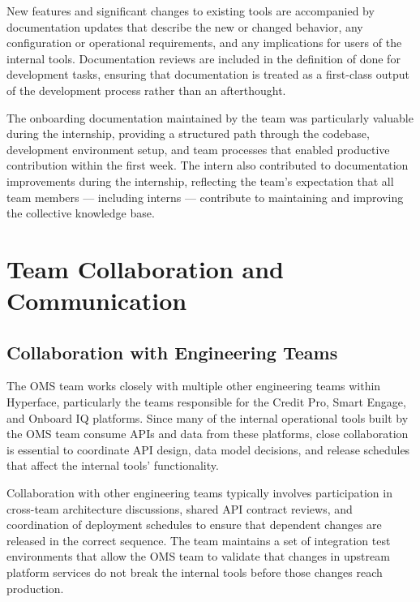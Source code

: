 New features and significant changes to existing tools are accompanied by documentation updates that describe the new or changed behavior, any configuration or operational requirements, and any implications for users of the internal tools. Documentation reviews are included in the definition of done for development tasks, ensuring that documentation is treated as a first-class output of the development process rather than an afterthought.

The onboarding documentation maintained by the team was particularly valuable during the internship, providing a structured path through the codebase, development environment setup, and team processes that enabled productive contribution within the first week. The intern also contributed to documentation improvements during the internship, reflecting the team's expectation that all team members — including interns — contribute to maintaining and improving the collective knowledge base.

\section{Team Collaboration and Communication}

\subsection{Collaboration with Engineering Teams}

The OMS team works closely with multiple other engineering teams within Hyperface, particularly the teams responsible for the Credit Pro, Smart Engage, and Onboard IQ platforms. Since many of the internal operational tools built by the OMS team consume APIs and data from these platforms, close collaboration is essential to coordinate API design, data model decisions, and release schedules that affect the internal tools' functionality.

Collaboration with other engineering teams typically involves participation in cross-team architecture discussions, shared API contract reviews, and coordination of deployment schedules to ensure that dependent changes are released in the correct sequence. The team maintains a set of integration test environments that allow the OMS team to validate that changes in upstream platform services do not break the internal tools before those changes reach production.

